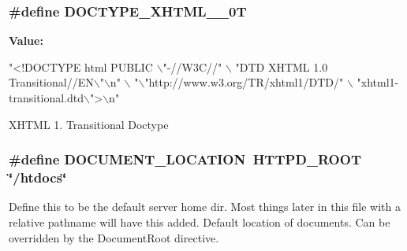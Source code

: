 \subsubsection[{\texorpdfstring{D\+O\+C\+T\+Y\+P\+E\+\_\+\+X\+H\+T\+M\+L\+\_\+1\+\_\+0T}{DOCTYPE_XHTML_1_0T}}]{\setlength{\rightskip}{0pt plus 5cm}\#define D\+O\+C\+T\+Y\+P\+E\+\_\+\+X\+H\+T\+M\+L\+\_\+\_\+0T}\hypertarget{group__APACHE__CORE__DAEMON_ga4b26e40deab9f18d2cbd36d163231430}{}\label{group__APACHE__CORE__DAEMON_ga4b26e40deab9f18d2cbd36d163231430}
{\bfseries Value\+:}
\begin{DoxyCode}
\textcolor{stringliteral}{"<!DOCTYPE html PUBLIC \(\backslash\)"-//W3C//"} \(\backslash\)
                           \textcolor{stringliteral}{"DTD XHTML 1.0 Transitional//EN\(\backslash\)"\(\backslash\)n"} \(\backslash\)
                           \textcolor{stringliteral}{"\(\backslash\)"http://www.w3.org/TR/xhtml1/DTD/"} \(\backslash\)
                           \textcolor{stringliteral}{"xhtml1-transitional.dtd\(\backslash\)">\(\backslash\)n"}
\end{DoxyCode}
X\+H\+T\+ML 1. Transitional Doctype 
\subsubsection[{\texorpdfstring{D\+O\+C\+U\+M\+E\+N\+T\+\_\+\+L\+O\+C\+A\+T\+I\+ON}{DOCUMENT_LOCATION}}]{\setlength{\rightskip}{0pt plus 5cm}\#define D\+O\+C\+U\+M\+E\+N\+T\+\_\+\+L\+O\+C\+A\+T\+I\+ON~{\bf H\+T\+T\+P\+D\+\_\+\+R\+O\+OT} \char`\"{}/htdocs\char`\"{}}\hypertarget{group__APACHE__CORE__DAEMON_gafbc041e73ff5e4698c985ea902af7c5a}{}\label{group__APACHE__CORE__DAEMON_gafbc041e73ff5e4698c985ea902af7c5a}
Define this to be the default server home dir. Most things later in this file with a relative pathname will have this added. Default location of documents. Can be overridden by the Document\+Root directive. 
